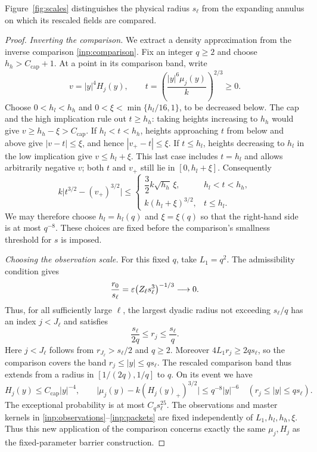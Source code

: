 Figure~\ref{fig:scales} distinguishes the physical radius $s_\ell$
from the expanding annulus on which its rescaled fields are compared.


\begin{proof}
\emph{Inverting the comparison.}
We extract a density approximation from the inverse comparison
\eqref{inp:comparison}.  Fix an integer $q\ge2$ and choose
$h_h>C_{\mathrm{cap}}+1$.  At a point in its comparison band, write
\[
 v=|y|^4H_j(y),\qquad
 t=\left(\frac{|y|^6\mu_j(y)}{k}\right)^{2/3}\ge0.
\]
Choose $0<h_l<h_h$ and $0<\xi<\min\{h_l/16,1\}$, to be decreased below.
The cap and the high implication rule out $t\ge h_h$: taking heights
increasing to $h_h$ would give $v\ge h_h-\xi>C_{\mathrm{cap}}$.
If $h_l<t<h_h$, heights approaching $t$ from below and above give
$|v-t|\le\xi$, and hence $|v_+-t|\le\xi$.
If $t\le h_l$, heights decreasing to $h_l$ in the low implication give
$v\le h_l+\xi$.  This last case includes $t=h_l$ and allows arbitrarily
negative $v$; both $t$ and $v_+$ still lie in $[0,h_l+\xi]$.
Consequently
\[
 k\bigl|t^{3/2}-(v_+)^{3/2}\bigr|
 \le
 \begin{cases}
  \dfrac32 k\sqrt{h_h}\,\xi,& h_l<t<h_h,\\[2pt]
  k(h_l+\xi)^{3/2},& t\le h_l.
 \end{cases}
\]
We may therefore choose $h_l=h_l(q)$ and $\xi=\xi(q)$ so that the
right-hand side is at most $q^{-8}$.  These choices are fixed before the
comparison's smallness threshold for $s$ is imposed.

\emph{Choosing the observation scale.}
For this fixed $q$, take $L_1=q^2$.  The admissibility condition gives
\[
 \frac{r_0}{s_\ell}
 =\varepsilon\bigl(Z_\ell s_\ell^3\bigr)^{-1/3}\longrightarrow0.
\]
Thus, for all sufficiently large $\ell$, the largest dyadic radius not
exceeding $s_\ell/q$ has an index $j<J_\ell$ and satisfies
\[
 \frac{s_\ell}{2q}\le r_j\le\frac{s_\ell}{q}.
\]
Here $j<J_\ell$ follows from $r_{J_\ell}>s_\ell/2$ and $q\ge2$.
Moreover $4L_1r_j\ge2qs_\ell$, so the comparison covers the band
$r_j\le|y|\le qs_\ell$.
The rescaled comparison band thus extends from a radius in
$[1/(2q),1/q]$ to $q$.  On its event we have
\begin{equation}
 H_j(y)\le C_{\mathrm{cap}}|y|^{-4},\qquad
 \bigl|\mu_j(y)-k(H_j(y)_+)^{3/2}\bigr|
 \le q^{-8}|y|^{-6}
 \quad(r_j\le|y|\le qs_\ell).
 \label{scales:physical-band}
\end{equation}
The exceptional probability is at most $C_qs_\ell^{25}$.
The observations and master kernels in
\eqref{inp:observations}--\eqref{inp:packets} are fixed independently of
$L_1,h_l,h_h,\xi$.  Thus this new application of the comparison concerns
exactly the same $\mu_j,H_j$ as the fixed-parameter barrier construction.


\end{proof}
